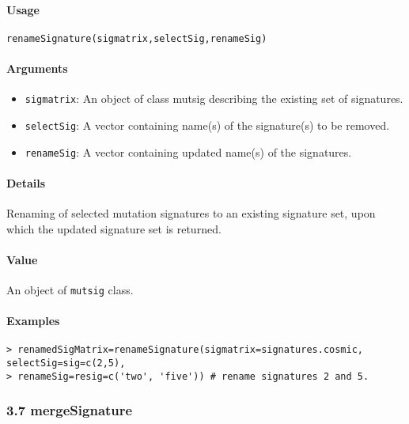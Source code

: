 \documentclass[]{article}
\providecommand{\tightlist}{%
  \setlength{\itemsep}{0pt}\setlength{\parskip}{0pt}}
\let\oldparagraph\paragraph
\renewcommand{\paragraph}[1]{\oldparagraph{#1}\mbox{}}
\begin{document}
\paragraph{\texorpdfstring{\textbf{Usage}}{Usage}}\label{usage-5}

\texttt{renameSignature(sigmatrix,selectSig,renameSig)}

\paragraph{\texorpdfstring{\textbf{Arguments
}}{Arguments }}\label{arguments-4}

\begin{itemize}
\tightlist
\item
  \texttt{sigmatrix}: An object of class mutsig describing the existing
  set of signatures.
\item
  \texttt{selectSig}: A vector containing name(s) of the signature(s) to
  be removed.
\item
  \texttt{renameSig}: A vector containing updated name(s) of the
  signatures.
\end{itemize}

\paragraph{\texorpdfstring{\textbf{Details}}{Details}}\label{details-4}

Renaming of selected mutation signatures to an existing signature set,
upon which the updated signature set is returned.

\paragraph{\texorpdfstring{\textbf{Value}}{Value}}\label{value-3}

An object of \texttt{mutsig} class.

\paragraph{\texorpdfstring{\textbf{Examples}}{Examples}}\label{examples-5}

\begin{verbatim}
> renamedSigMatrix=renameSignature(sigmatrix=signatures.cosmic, selectSig=sig=c(2,5), 
> renameSig=resig=c('two', 'five')) # rename signatures 2 and 5.
\end{verbatim}

\subsubsection{3.7 mergeSignature}\label{mergesignature}
\end{document}
